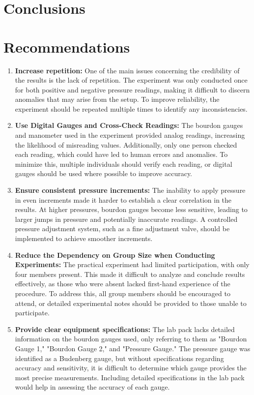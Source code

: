 \documentclass{article}
\begin{document}
	\section{Conclusions}
	
	
	\newpage
	\section{Recommendations}  		
	\vspace{1em}
	\begin{enumerate}
		\item \textbf{Increase repetition:} One of the main issues concerning the credibility of the results is the lack of repetition. The experiment was only conducted once for both positive and negative pressure readings, making it difficult to discern anomalies that may arise from the setup. To improve reliability, the experiment should be repeated multiple times to identify any inconsistencies.  
		
		\item  \textbf{Use Digital Gauges and Cross-Check Readings:} The bourdon gauges and manometer used in the experiment provided analog readings, increasing the likelihood of misreading values. Additionally, only one person checked each reading, which could have led to human errors and anomalies. To minimize this, multiple individuals should verify each reading, or digital gauges should be used where possible to improve accuracy.  
		
		\item \textbf{Ensure consistent pressure increments:} The inability to apply pressure in even increments made it harder to establish a clear correlation in the results. At higher pressures, bourdon gauges become less sensitive, leading to larger jumps in pressure and potentially inaccurate readings. A controlled pressure adjustment system, such as a fine adjustment valve, should be implemented to achieve smoother increments.  
		
		\item \textbf{Reduce the Dependency on Group Size when Conducting Experiments:} The practical experiment had limited participation, with only four members present. This made it difficult to analyze and conclude results effectively, as those who were absent lacked first-hand experience of the procedure. To address this, all group members should be encouraged to attend, or detailed experimental notes should be provided to those unable to participate.  
		
		\item \textbf{Provide clear equipment specifications:} The lab pack lacks detailed information on the bourdon gauges used, only referring to them as "Bourdon Gauge 1," "Bourdon Gauge 2," and "Pressure Gauge." The pressure gauge was identified as a Budenberg gauge, but without specifications regarding accuracy and sensitivity, it is difficult to determine which gauge provides the most precise measurements. Including detailed specifications in the lab pack would help in assessing the accuracy of each gauge.  
	\end{enumerate}
	
\end{document}
